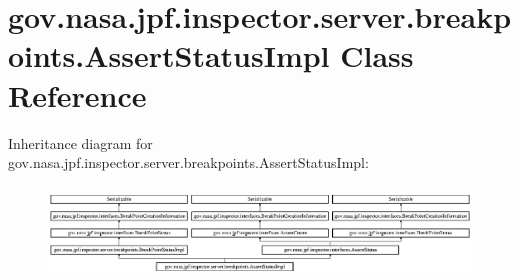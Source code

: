 \hypertarget{classgov_1_1nasa_1_1jpf_1_1inspector_1_1server_1_1breakpoints_1_1_assert_status_impl}{}\section{gov.\+nasa.\+jpf.\+inspector.\+server.\+breakpoints.\+Assert\+Status\+Impl Class Reference}
\label{classgov_1_1nasa_1_1jpf_1_1inspector_1_1server_1_1breakpoints_1_1_assert_status_impl}
Inheritance diagram for gov.\+nasa.\+jpf.\+inspector.\+server.\+breakpoints.\+Assert\+Status\+Impl\+:\begin{figure}[H]
\begin{center}
\leavevmode
\includegraphics[height=2.449694cm]{classgov_1_1nasa_1_1jpf_1_1inspector_1_1server_1_1breakpoints_1_1_assert_status_impl}
\end{center}
\end{figure}
